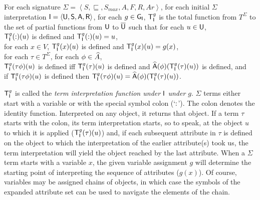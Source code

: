 \documentclass[output=paper,biblatex,babelshorthands,newtxmath,draftmode,colorlinks,citecolor=brown]{langscibook}
\begin{document}
{\begin{mydef}
For each signature $\Sigma=\left<S,\sqsubseteq,S_{max},A,F,R,Ar\right>$,
for each initial $\Sigma$ interpretation $\mathsf{I}=\langle\mathsf{U},\mathsf{S},\mathsf{A},\mathsf{R}\rangle$,
for each $g\in\mathsf{G}_{\mathsf{I}}$,
$\mathsf{T}^{g}_{\mathsf{I}}$ is the total function from $T^{\Sigma}$ to the
set of partial functions from $\mathsf{U}$ to $\overline{\mathsf{U}}$ such that
for each $u\in\mathsf{U}$,\\
\hspace*{.5cm} $\mathsf{T}^{g}_{\mathsf{I}}(\operatorname{:})(u)$ is defined and
$\mathsf{T}^{g}_{\mathsf{I}}(\operatorname{:})(u)=u$,\\
\hspace*{.5cm}for each $x\in V$, $\mathsf{T}^{g}_{\mathsf{I}}(x)(u)$ is defined and
$\mathsf{T}^{g}_{\mathsf{I}}(x)(u)=g(x)$,\\
\hspace*{.5cm}for each $\tau\in T^{\Sigma}$, for each $\phi\in\widehat{A}$,\\
\hspace*{1cm}$\mathsf{T}^{g}_{\mathsf{I}}(\tau\phi)(u)$ is defined %
             iff $\mathsf{T}^{g}_{\mathsf{I}}(\tau)(u)$ is defined and 
             $\widehat{\mathsf{A}}(\phi)(\mathsf{T}^{g}_{\mathsf{I}}(\tau)(u))$ is defined, and\\
\hspace*{1cm}if $\mathsf{T}^{g}_{\mathsf{I}}(\tau\phi)(u)$ is defined then
             $\mathsf{T}^{g}_{\mathsf{I}}(\tau\phi)(u)=\widehat{\mathsf{A}}(\phi)(\mathsf{T}^{g}_{\mathsf{I}}(\tau)(u))$.
\end{mydef}
$\mathsf{T}^{g}_{\mathsf{I}}$ is called the \emph{term interpretation function
  under $\mathsf{I}$ under $g$}. $\Sigma$ terms either start with a
variable or with the special symbol colon (`$\operatorname{:}$'). The colon
denotes the identity function. Interpreted on any object, it returns
that object.  If a term $\tau$ starts with the colon, its term
interpretation starts, so to speak, at the object $u$ to which it is
applied ($\mathsf{T}^{g}_{\mathsf{I}}(\tau)(u)$) and, if each subsequent
attribute in $\tau$ is defined on the object to which the
interpretation of the earlier attribute(s) took us, the term
interpretation will yield the object reached by the last
attribute. When a $\Sigma$ term starts with a variable $x$, the given
variable assignment $g$ will determine the starting point of
interpreting the sequence of attributes ($g(x)$).  Of course,
variables may be assigned chains of objects, in which case the symbols
of the expanded attribute set can be used to navigate the elements of
the chain.

}
\end{document}
